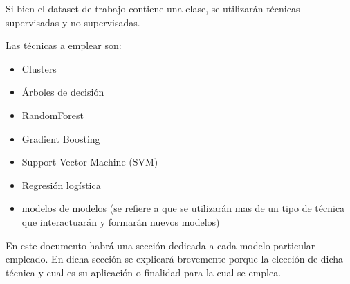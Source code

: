 Si bien el dataset de trabajo contiene una clase, se utilizarán técnicas supervisadas y no supervisadas.

Las técnicas a emplear son:
\begin{itemize}
	\item Clusters
	\item Árboles de decisión
	\item RandomForest
	\item Gradient Boosting
	\item Support Vector Machine (SVM)
	\item Regresión logística
	\item modelos de modelos (se refiere a que se utilizarán mas de un tipo de técnica que interactuarán y formarán nuevos modelos)
\end{itemize}


En este documento habrá una sección dedicada a cada modelo particular empleado. En dicha sección se explicará brevemente porque la elección de dicha técnica y cual es su aplicación o finalidad para la cual se emplea.